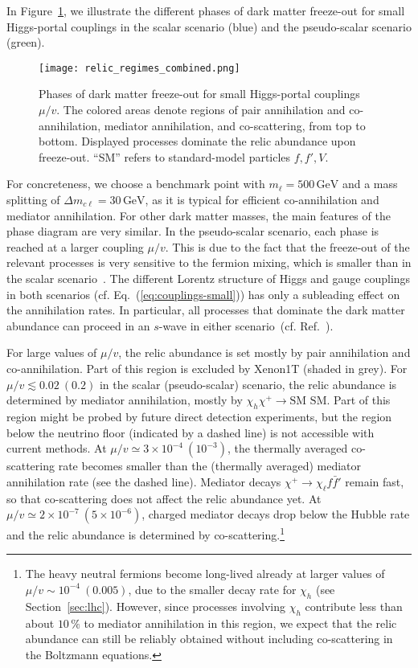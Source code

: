 \documentclass[nofootinbib,prd,aps,superscriptaddress,preprintnumbers]{revtex4}
\begin{document}
In Figure~\ref{fig:relic-regimes}, we illustrate the different phases of dark matter freeze-out for small Higgs-portal couplings in the scalar scenario (blue) and the pseudo-scalar scenario (green).
\begin{figure}[!t]
\centering
\texttt{[image: relic\_regimes\_combined.png]}
\caption{\label{fig:relic-regimes}Phases of dark matter freeze-out for small Higgs-portal couplings $\mu/v$. The colored areas denote regions of pair annihilation and co-annihilation, mediator annihilation, and co-scattering, from top to bottom. Displayed processes dominate the relic abundance upon freeze-out. ``SM'' refers to standard-model particles $f,f',V$.}
\end{figure}
 For concreteness, we choose a benchmark point with $m_\ell = 500\,\text{GeV}$ and a mass splitting of $\Delta m_{c\ell} = 30\,\text{GeV}$, as it is typical for efficient co-annihilation and mediator annihilation. For other dark matter masses, the main features of the phase diagram are very similar. In the pseudo-scalar scenario, each phase is reached at a larger coupling $\mu/v$. This is due to the fact that the freeze-out of the relevant processes is very sensitive to the fermion mixing, which is smaller than in the scalar scenario~\cite{Baer:2005jq}. The different Lorentz structure of Higgs and gauge couplings in both scenarios (cf. Eq.~(\ref{eq:couplings-small})) has only a subleading effect on the annihilation rates. In particular, all processes that dominate the dark matter abundance can proceed in an $s$-wave in either scenario~(cf. Ref.~\cite{Drees:1992am}).

For large values of $\mu/v$, the relic abundance is set mostly by pair annihilation and co-annihilation. Part of this region is excluded by Xenon1T (shaded in grey). For $\mu/v\lesssim 0.02\ (0.2)$ in the scalar (pseudo-scalar) scenario, the relic abundance is determined by mediator annihilation, mostly by $\chi_h \chi^+ \to \text{SM SM}$. Part of this region might be probed by future direct detection experiments, but the region below the neutrino floor  (indicated by a dashed line) is not accessible with current methods. At $\mu/v\simeq 3\times 10^{-4}\ (10^{-3})$, the thermally averaged co-scattering rate becomes smaller than the (thermally averaged) mediator annihilation rate (see the dashed line). Mediator decays $\chi^+\to\chi_\ell f\bar{f}'$ remain fast, so that co-scattering does not affect the relic abundance yet. At $\mu/v\simeq 2\times 10^{-7}\ (5\times 10^{-6})$, charged mediator decays drop below the Hubble rate and the relic abundance is determined by co-scattering.\footnote{The heavy neutral fermions become long-lived already at larger values of $\mu/v\sim 10^{-4}\ (0.005)$, due to the smaller decay rate for $\chi_h$ (see Section~\ref{sec:lhc}). However, since processes involving $\chi_h$ contribute less than about $10\,\%$ to mediator annihilation in this region, we expect that the relic abundance can still be reliably obtained without including co-scattering in the Boltzmann equations.}
\end{document}
